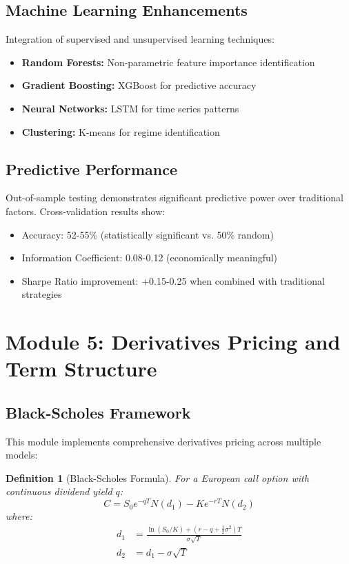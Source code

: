 \documentclass[12pt,a4paper]{article}
\newtheorem{definition}{Definition}
\begin{document}
\subsection{Machine Learning Enhancements}

Integration of supervised and unsupervised learning techniques:

\begin{itemize}
    \item \textbf{Random Forests:} Non-parametric feature importance identification
    \item \textbf{Gradient Boosting:} XGBoost for predictive accuracy
    \item \textbf{Neural Networks:} LSTM for time series patterns
    \item \textbf{Clustering:} K-means for regime identification
\end{itemize}

\subsection{Predictive Performance}

Out-of-sample testing demonstrates significant predictive power over traditional factors. Cross-validation results show:
\begin{itemize}
    \item Accuracy: 52-55\% (statistically significant vs. 50\% random)
    \item Information Coefficient: 0.08-0.12 (economically meaningful)
    \item Sharpe Ratio improvement: +0.15-0.25 when combined with traditional strategies
\end{itemize}

\section{Module 5: Derivatives Pricing and Term Structure}

\subsection{Black-Scholes Framework}

This module implements comprehensive derivatives pricing across multiple models:

\begin{definition}[Black-Scholes Formula]
For a European call option with continuous dividend yield $q$:
\begin{equation}
C = S_0 e^{-qT} N(d_1) - K e^{-rT} N(d_2)
\end{equation}
where:
\begin{align}
d_1 &= \frac{\ln(S_0/K) + (r-q+\frac{1}{2}\sigma^2)T}{\sigma\sqrt{T}} \\
d_2 &= d_1 - \sigma\sqrt{T}
\end{align}
\end{definition}
\end{document}
